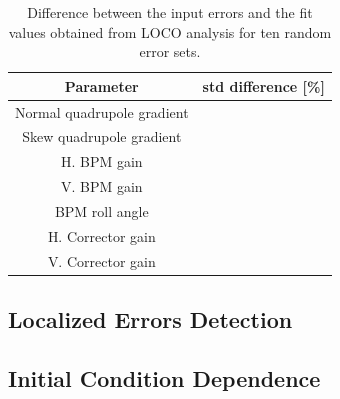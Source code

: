 \begin{table}
    \centering
    \caption{Difference between the input errors and the fit values obtained from LOCO analysis for ten random error sets.}
    \label{tab:diff_target}
    \begin{tabular}{cc}
        Parameter & std difference [\%] \\ 
        \toprule\toprule
        Normal quadrupole gradient &  \\
        Skew quadrupole gradient &  \\
        H. BPM gain &   \\
        V. BPM gain &   \\
        BPM roll angle &  \\ 
        H. Corrector gain &  \\
        V. Corrector gain &   \\
        \bottomrule\bottomrule
    \end{tabular}
\end{table}
\subsection{Localized Errors Detection}
\subsection{Initial Condition Dependence}